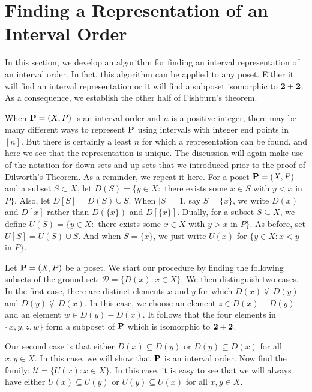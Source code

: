 \section{Finding a Representation of an Interval Order}
\label{s:posets:intervalorder:findrep}

In this section, we develop an algorithm for finding an interval
representation of an interval order.  In fact, this
algorithm can be applied to any poset.  Either it will find
an interval representation or it will find a subposet isomorphic
to $\mathbf{2}+\mathbf{2}$.  As a consequence, we establish the other half of Fishburn's theorem.

When $\mathbf{P}=(X,P)$ is an interval order and $n$ is a positive integer, there
may be many different ways to represent $\mathbf{P}$ using intervals with
integer end points in $[n]$.  But there is certainly a least $n$ for
which a representation can be found, and here  we see that the representation is
unique.  The discussion will again make use of the notation for down
sets and up sets that we introduced prior to the proof of Dilworth's
Theorem. As a reminder, we repeat it here. For a poset $\mathbf{P}=(X,P)$ and a
subset $S\subset X$, let $D(S) = \{y\in X:$ there exists some $x\in S$
with $y<x$ in $P\}$.  Also, let $D[S]=D(S)\cup S$.  When $|S|=1$, say
$S=\{x\}$, we write $D(x)$ and $D[x]$ rather than $D(\{x\})$ and
$D[\{x\}]$.  Dually, for a subset $S\subseteq X$, we define $U(S) =
\{y\in X:$ there exists some $x\in X$ with $y>x$ in $P\}$.  As before,
set $U[S]=U(S)\cup S$.  And when $S=\{x\}$, we just write $U(x)$ for
$\{y\in X:x<y$ in $P\}$.

Let $\mathbf{P}=(X,P)$ be a poset.  We start our procedure by finding
the following subsets of the ground set:\quad  
$\mathcal{D} = \{D(x):x\in X\}$.  We then distinguish two
cases.  In the first case, there are distinct elements
$x$ and $y$ for which $D(x)\nsubseteq D(y)$ and $D(y)\nsubseteq D(x)$.
In this case, we choose an element $z\in D(x)-D(y)$ and an element
$w\in D(y)-D(x)$.  It follows that the four elements in
$\{x,y,z,w\}$ form a subposet of $\mathbf{P}$ which is isomorphic to
$\mathbf{2}+\mathbf{2}$. 

Our second case is that either $D(x)\subseteq D(y)$ or
$D(y)\subseteq D(x)$ for all $x,y\in X$.  In this case, we
will show that $\mathbf{P}$ is an interval order.  Now find
the family: $\mathcal{U} = \{U(x):x\in X\}$.  In this case, it is 
easy to see that we will always have either $U(x)\subseteq U(y)$ or
$U(y)\subseteq U(x)$ for all $x,y\in X$.

